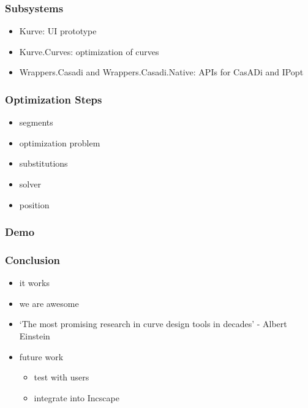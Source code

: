 \documentclass{beamer}
\begin{document}
		\begin{frame}
			\frametitle{Subsystems}
			\begin{itemize}
				\item Kurve: UI prototype
				\item Kurve.Curves: optimization of curves
				\item Wrappers.Casadi and Wrappers.Casadi.Native: APIs for CasADi and IPopt
			\end{itemize}
		\end{frame}
		
		\begin{frame}
			\frametitle{Optimization Steps}
			\begin{itemize}
				\item segments
				\item optimization problem
				\item substitutions
				\item solver
				\item position
			\end{itemize}
		\end{frame}
		
		
		\begin{frame}
			\frametitle{Demo}
		\end{frame}
		
		\begin{frame}
			\frametitle{Conclusion}
			\begin{itemize}
				\item it works
				\item we are awesome
				\item `The most promising research in curve design tools in decades' - Albert Einstein
				\item future work
				\begin{itemize}
					\item test with users
					\item integrate into Incscape
				\end{itemize}
			\end{itemize}
		\end{frame}
\end{document}
